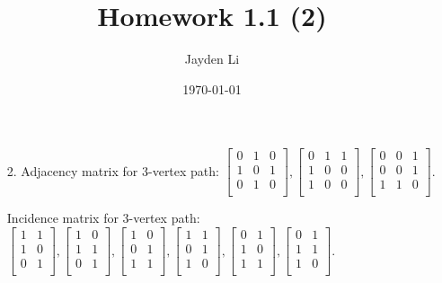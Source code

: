 \documentclass{article}
\title{\vspace*{-40pt}Homework 1.1 (2)}
\author{Jayden Li}
\date{\today}
\begin{document}
\fontsize{12pt}{12pt}\selectfont
\setlength{\abovedisplayskip}{\abovedisplayskip/2}
\setlength{\belowdisplayskip}{\belowdisplayskip/2}
\maketitle

\begin{enumerate}
	\item[2.]
		Adjacency matrix for 3-vertex path:
		$\displaystyle 
			\begin{bmatrix}
				0 & 1 & 0 \\
				1 & 0 & 1 \\
				0 & 1 & 0 \\
			\end{bmatrix},
			\begin{bmatrix}
				0 & 1 & 1 \\
				1 & 0 & 0 \\
				1 & 0 & 0 \\
			\end{bmatrix},
			\begin{bmatrix}
				0 & 0 & 1 \\
				0 & 0 & 1 \\
				1 & 1 & 0 \\
			\end{bmatrix}
		$.

		Incidence matrix for 3-vertex path:
		$\displaystyle 
			\begin{bmatrix}
				1 & 1 \\
				1 & 0 \\
				0 & 1 \\
			\end{bmatrix},
			\begin{bmatrix}
				1 & 0 \\
				1 & 1 \\
				0 & 1 \\
			\end{bmatrix},
			\begin{bmatrix}
				1 & 0 \\
				0 & 1 \\
				1 & 1 \\
			\end{bmatrix},
			\begin{bmatrix}
				1 & 1 \\
				0 & 1 \\
				1 & 0 \\
			\end{bmatrix},
			\begin{bmatrix}
				0 & 1 \\
				1 & 0 \\
				1 & 1 \\
			\end{bmatrix},
			\begin{bmatrix}
				0 & 1 \\
				1 & 1 \\
				1 & 0 \\
			\end{bmatrix}
		$.


\end{enumerate}
\end{document}
